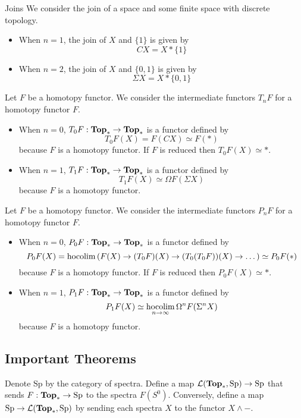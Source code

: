 \documentclass[a4paper]{article}
\begin{document}
\begin{eg}{Joins}{} We consider the join of a space and some finite space with discrete topology. 
\begin{itemize}
\item When $n=1$, the join of $X$ and $\{1\}$ is given by $$CX=X\ast\{1\}$$
\item When $n=2$, the join of $X$ and $\{0,1\}$ is given by $$\Sigma X=X\ast\{0,1\}$$
\end{itemize}
\end{eg}

\begin{eg}{}{} Let $F$ be a homotopy functor. We consider the intermediate functors $T_nF$ for a homotopy functor $F$. 
\begin{itemize}
\item When $n=0$, $T_0F:\bold{Top}_\ast\to\bold{Top}_\ast$ is a functor defined by $$T_0F(X)=F(CX)\simeq F(\ast)$$ because $F$ is a homotopy functor. If $F$ is reduced then $T_0F(X)\simeq\ast$. 
\item When $n=1$, $T_1F:\bold{Top}_\ast\to\bold{Top}_\ast$ is a functor defined by $$T_1F(X)\simeq\Omega F(\Sigma X)$$ because $F$ is a homotopy functor. 
\end{itemize}
\end{eg}

\begin{eg}{}{} Let $F$ be a homotopy functor. We consider the intermediate functors $P_nF$ for a homotopy functor $F$. 
\begin{itemize}
\item When $n=0$, $P_0F:\bold{Top}_\ast\to\bold{Top}_\ast$ is a functor defined by $$P_0F(X)=\operatorname*{hocolim}\left(F(X)\to (T_0F)(X)\to (T_0(T_0F))(X)\to\dots\right)\simeq P_0F(\ast)$$ because $F$ is a homotopy functor. If $F$ is reduced then $P_0F(X)\simeq\ast$. 
\item When $n=1$, $P_1F:\bold{Top}_\ast\to\bold{Top}_\ast$ is a functor defined by $$P_1F(X)\simeq\operatorname*{hocolim}_{n\to\infty}\Omega^nF(\Sigma^nX)$$ because $F$ is a homotopy functor. 
\end{itemize}
\end{eg}

\subsection{Important Theorems}
Denote $\text{Sp}$ by the category of spectra. Define a map $\mathcal{L}(\bold{Top}_\ast,\text{Sp})\to\text{Sp}$ that sends $F:\bold{Top}_\ast\to\text{Sp}$ to the spectra $F(S^0)$. Conversely, define a map $\text{Sp}\to\mathcal{L}(\bold{Top}_\ast,\text{Sp})$ by sending each spectra $X$ to the functor $X\wedge -$. \\~\\
\end{document}
